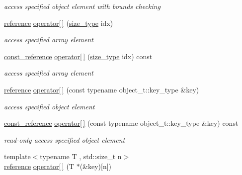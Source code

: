 \begin{DoxyCompactItemize}
\begin{DoxyCompactList}\small\item\em access specified object element with bounds checking \end{DoxyCompactList}\item 
\hyperlink{classnlohmann_1_1basic__json_a3ec8e17be8732fe436e9d6733f52b7a3}{reference} \hyperlink{classnlohmann_1_1basic__json_a59732a1de287a7301cca19a7a7748159}{operator\mbox{[}$\,$\mbox{]}} (\hyperlink{classnlohmann_1_1basic__json_a1579a8f72a230358d6cd1a6e8a62859b}{size\-\_\-type} idx)
\begin{DoxyCompactList}\small\item\em access specified array element \end{DoxyCompactList}\item 
\hyperlink{classnlohmann_1_1basic__json_af677a29b0e66edc9f66e5167e4667071}{const\-\_\-reference} \hyperlink{classnlohmann_1_1basic__json_a99f2e765029e51dd0fff018650f92eea}{operator\mbox{[}$\,$\mbox{]}} (\hyperlink{classnlohmann_1_1basic__json_a1579a8f72a230358d6cd1a6e8a62859b}{size\-\_\-type} idx) const 
\begin{DoxyCompactList}\small\item\em access specified array element \end{DoxyCompactList}\item 
\hyperlink{classnlohmann_1_1basic__json_a3ec8e17be8732fe436e9d6733f52b7a3}{reference} \hyperlink{classnlohmann_1_1basic__json_a92fbb711a36b5ce78ee228b26787c034}{operator\mbox{[}$\,$\mbox{]}} (const typename object\-\_\-t\-::key\-\_\-type \&key)
\begin{DoxyCompactList}\small\item\em access specified object element \end{DoxyCompactList}\item 
\hyperlink{classnlohmann_1_1basic__json_af677a29b0e66edc9f66e5167e4667071}{const\-\_\-reference} \hyperlink{classnlohmann_1_1basic__json_a2e26bd0b0168abb61f67ad5bcd5b9fa1}{operator\mbox{[}$\,$\mbox{]}} (const typename object\-\_\-t\-::key\-\_\-type \&key) const 
\begin{DoxyCompactList}\small\item\em read-\/only access specified object element \end{DoxyCompactList}\item 
{\footnotesize template$<$typename T , std\-::size\-\_\-t n$>$ }\\\hyperlink{classnlohmann_1_1basic__json_a3ec8e17be8732fe436e9d6733f52b7a3}{reference} \hyperlink{classnlohmann_1_1basic__json_a140b8251f82e99ad279dcad5c977e26b}{operator\mbox{[}$\,$\mbox{]}} (T $\ast$(\&key)\mbox{[}n\mbox{]})

\end{DoxyCompactItemize}
